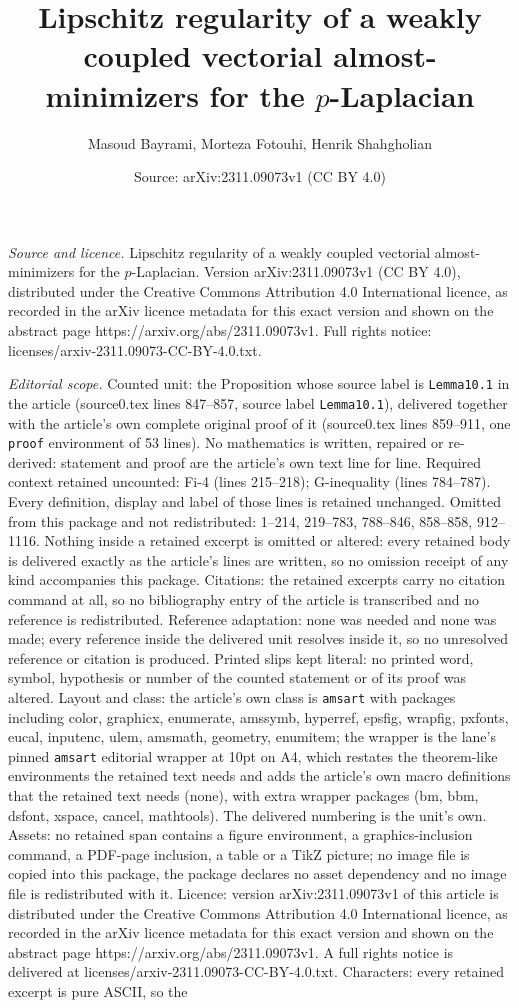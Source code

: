 \documentclass[10pt,a4paper]{amsart}
\title[Lipschitz regularity of a weakly coupled vectorial almost-mi]{Lipschitz regularity of a weakly coupled vectorial almost-minimizers for the $p$-Laplacian}
\author{Masoud Bayrami, Morteza Fotouhi, Henrik Shahgholian}
\date{Source: arXiv:2311.09073v1 (CC BY 4.0)}
\begin{document}
\maketitle

\noindent\emph{Source and licence.} Lipschitz regularity of a weakly coupled vectorial almost-minimizers for the $p$-Laplacian. Version arXiv:2311.09073v1 (CC BY 4.0), distributed under the Creative Commons Attribution 4.0 International licence, as recorded in the arXiv licence metadata for this exact version and shown on the abstract page https://arxiv.org/abs/2311.09073v1. Full rights notice: licenses/arxiv-2311.09073-CC-BY-4.0.txt.\par\smallskip

\noindent\textit{Editorial scope.} Counted unit: the Proposition whose source label is \texttt{Lemma10.1} in the article (source0.tex lines 847--857, source label \texttt{Lemma10.1}), delivered together with the article's own complete original proof of it (source0.tex lines 859--911, one \texttt{proof} environment of 53 lines). No mathematics is written, repaired or re-derived: statement and proof are the article's own text line for line. Required context retained uncounted: Fi-4 (lines 215--218); G-inequality (lines 784--787). Every definition, display and label of those lines is retained unchanged. Omitted from this package and not redistributed: 1--214, 219--783, 788--846, 858--858, 912--1116. Nothing inside a retained excerpt is omitted or altered: every retained body is delivered exactly as the article's lines are written, so no omission receipt of any kind accompanies this package. Citations: the retained excerpts carry no citation command at all, so no bibliography entry of the article is transcribed and no reference is redistributed. Reference adaptation: none was needed and none was made; every reference inside the delivered unit resolves inside it, so no unresolved reference or citation is produced. Printed slips kept literal: no printed word, symbol, hypothesis or number of the counted statement or of its proof was altered. Layout and class: the article's own class is \texttt{amsart} with packages including color, graphicx, enumerate, amssymb, hyperref, epsfig, wrapfig, pxfonts, eucal, inputenc, ulem, amsmath, geometry, enumitem; the wrapper is the lane's pinned \texttt{amsart} editorial wrapper at 10pt on A4, which restates the theorem-like environments the retained text needs and adds the article's own macro definitions that the retained text needs (none), with extra wrapper packages (bm, bbm, dsfont, xspace, cancel, mathtools). The delivered numbering is the unit's own. Assets: no retained span contains a figure environment, a graphics-inclusion command, a PDF-page inclusion, a table or a TikZ picture; no image file is copied into this package, the package declares no asset dependency and no image file is redistributed with it. Licence: version arXiv:2311.09073v1 of this article is distributed under the Creative Commons Attribution 4.0 International licence, as recorded in the arXiv licence metadata for this exact version and shown on the abstract page https://arxiv.org/abs/2311.09073v1. A full rights notice is delivered at licenses/arxiv-2311.09073-CC-BY-4.0.txt. Characters: every retained excerpt is pure ASCII, so the 
\end{document}
